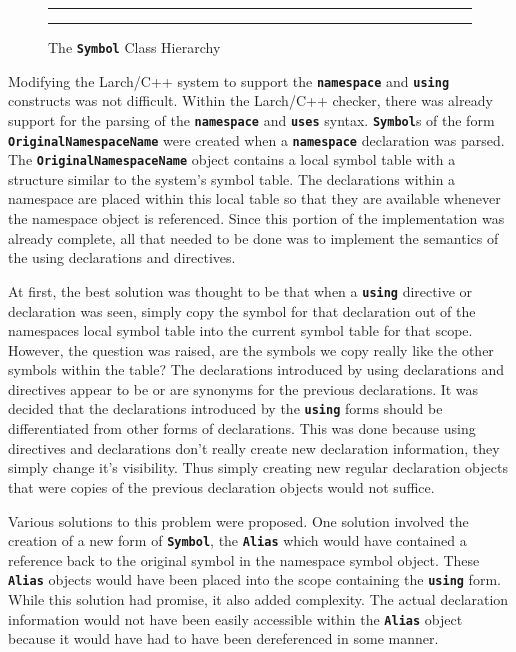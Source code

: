 \documentclass[12pt]{article} %
\newcommand{\reserved}[1]{\textbf{\texttt{#1}}} %
\newcommand{\UNSPACEFORBOX}{\vspace{-2ex}}
\newcommand{\HLINE}{\UNSPACEFORBOX%
\begin{flushleft}\rule{\textwidth}{0.01in}\end{flushleft}%
\UNSPACEFORBOX}
\newenvironment{BFIGURE}{

\begin{figure}
\small
\HLINE
}{
\HLINE
\normalsize
\end{figure}
}
\begin{document}
\begin{BFIGURE}
\begin{center}

\end{center}
\caption{The \reserved{Symbol} Class Hierarchy}
\label{symbolh}
\end{BFIGURE}

Modifying the Larch/C++ system to support the \reserved{namespace} and
\reserved{using} constructs was not difficult. Within the Larch/C++
checker, there was already support for the parsing of the
\reserved{namespace} and \reserved{uses} syntax. \reserved{Symbol}s of
the form
\reserved{OriginalNamespaceName} were created when a
\reserved{namespace}  declaration was parsed. The
\reserved{OriginalNamespaceName} object contains a local symbol table
with a structure similar to the system's symbol table. The declarations
within a namespace are placed within this local table so that they are
available whenever the namespace object is referenced. Since this
portion of the implementation was already complete, all that needed to
be done was to implement the semantics of the using declarations and
directives.

At first, the best solution was thought to be that when a \reserved{using}
directive or declaration was seen, simply copy the symbol for that
declaration out of the namespaces local symbol table into the current
symbol table for that scope. However, the question was raised, are the
symbols we copy really like the other symbols within the table? The
declarations introduced by using declarations and directives appear to
be or are synonyms for the previous declarations. It was decided that
the declarations introduced by the \reserved{using} forms should be
differentiated from other forms of declarations. This was done because 
using directives and declarations don't really create new declaration
information, they simply change it's visibility. Thus simply creating
new regular declaration objects that were copies of the previous
declaration objects would not suffice.

Various solutions to this problem were proposed. One solution involved
the creation of a new form of \reserved{Symbol}, the \reserved{Alias}
which would have contained a reference back to the original symbol in
the namespace symbol object. These \reserved{Alias} objects would have been
placed into the scope containing the \reserved{using} form. While this
solution had promise, it also added complexity. The actual declaration
information would not have been easily accessible within the \reserved{Alias}
object because it would have had to have been dereferenced in some manner.
\end{document}
